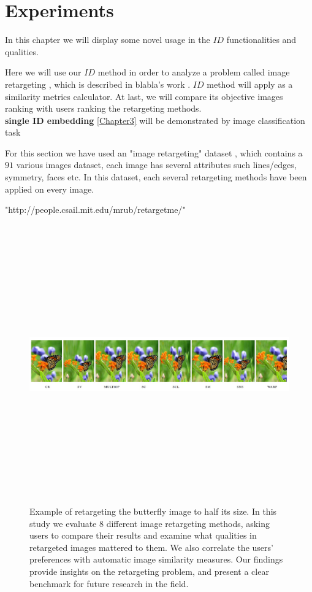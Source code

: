 
\chapter{Experiments} %

\label{Chapter8}

In this chapter we will display some novel usage in the $ID$ functionalities and qualities.

Here we will use our $ID$ method in order to analyze a problem called image retargeting \cite{}, which is described in blabla's work \cite{}. $ID$ method will apply as a similarity metrics calculator. At last, we will compare its objective images ranking with users ranking the retargeting methods. \\

\textbf{single ID embedding} \ref{Chapter3} will be demonstrated by image classification task


For this section we have used an "image retargeting" dataset \cite{ggg}, which contains a $91$ various images dataset, each image has several attributes such lines/edges, symmetry, faces etc. In this dataset, each several retargeting methods have been applied on every image.

"http://people.csail.mit.edu/mrub/retargetme/"

\begin{figure}[h] \label{rteregt}
	
	\includegraphics[width=\linewidth,height=12cm,keepaspectratio]{Figures/retargeting}
	\caption[image retargeting example]
	{Example of retargeting the butterfly image to half its size. In this study we evaluate 8 different image retargeting methods, asking users to compare their results and examine what qualities in retargeted images mattered to them. We also correlate the users’ preferences with automatic image similarity measures. Our findings provide insights on the retargeting problem, and present a clear benchmark for future research in the field.}
	
\end{figure}


